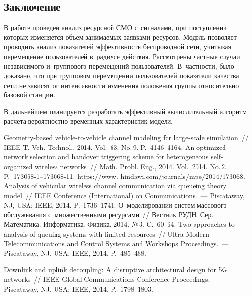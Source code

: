 \begin{multicols}{2}
\vspace*{-9pt}

  \section{Заключение}
  
  В работе проведен анализ ресурсной СМО с~сигналами, при поступлении 
которых изменяется объем занимаемых заявками ресурсов. Модель 
позволяет проводить анализ показателей эффективности беспроводной сети, 
учитывая перемещение пользователей в~радиусе действия. Рассмотрены 
частные случаи независимого и~группового перемещений пользователей. 
В~частности, было доказано, что при групповом перемещении пользователей 
показатели качества сети не зависят от интенсивности изменения положения 
группы относительно базовой станции. 
  
  В дальнейшем планируется разработать эффективный вычислительный 
алгоритм расчета ве\-ро\-ят\-но\-ст\-но-вре\-мен\-н$\acute{\mbox{ы}}$х 
характеристик модели.
  
{\small\frenchspacing
 {%
 \begin{thebibliography}{99}
 Geometry-based vehicle-to-vehicle 
channel modeling for large-scale simulation~// IEEE T. Veh. 
Technol., 2014. Vol.~63. No.\,9. P.~4146--4164.
 An optimized network selection and \mbox{handover} triggering 
scheme for heterogeneous self-organized wireless networks~// Math. 
Probl. Eng., 2014. Vol.~2014. No.\,2. P.~173068-1--173068-11. {\sf 
https://www. hindawi.com/journals/mpe/2014/173068}.
 Analysis of vehicular wireless channel communication via 
queueing theory model~// IEEE Conference (International) on 
Communications.~--- Piscataway, NJ, USA: IEEE, 2014. P.~1736--1741.
 О~моделировании систем массового 
обслуживания с~множественными ресурсами~// Вестник РУДН. Сер. 
Математика. Информатика. Физика, 2014. №\,3. C.~60--64.
 Two approaches to 
analysis of queuing systems with limited resources~// Ultra Modern 
Telecommunications and Control Systems and Workshops  
Proceedings.~--- Piscataway, NJ, USA: IEEE, 2014. P.~485--488. 

 Downlink and uplink 
decoupling: A~disruptive architectural design for 5G networks~// IEEE 
Global Communications Conference Proceedings.~--- 
Piscataway, NJ, USA: IEEE, 2014. P.~1798--1803.


\end{thebibliography}}}
\end{multicols}
